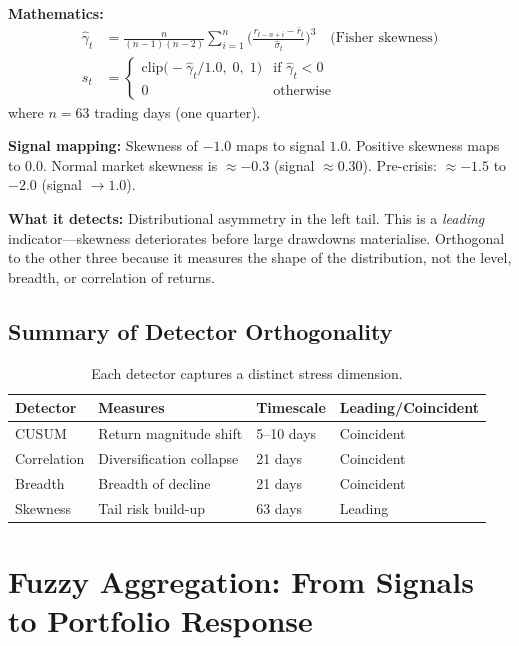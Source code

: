 \documentclass[11pt,a4paper]{article}
\begin{document}
\textbf{Mathematics:}
\begin{align}
  \hat{\gamma}_t &= \frac{n}{(n-1)(n-2)} \sum_{i=1}^{n} \bigg(\frac{r_{t-n+i} - \bar{r}_t}{\hat{\sigma}_t}\bigg)^3 \quad \text{(Fisher skewness)} \\
  s_t &= \begin{cases} \mathrm{clip}\big(-\hat{\gamma}_t / 1.0,\; 0,\; 1\big) & \text{if } \hat{\gamma}_t < 0 \\ 0 & \text{otherwise} \end{cases} \label{eq:skew-signal}
\end{align}
where $n = 63$ trading days (one quarter).

\textbf{Signal mapping:} Skewness of $-1.0$ maps to signal $1.0$. Positive skewness maps to $0.0$. Normal market skewness is $\approx -0.3$ (signal $\approx 0.30$). Pre-crisis: $\approx -1.5$ to $-2.0$ (signal $\to 1.0$).

\textbf{What it detects:} Distributional asymmetry in the left tail. This is a \emph{leading} indicator---skewness deteriorates before large drawdowns materialise. Orthogonal to the other three because it measures the shape of the distribution, not the level, breadth, or correlation of returns.

\subsection{Summary of Detector Orthogonality}

\begin{table}[h]
\centering
\begin{tabular}{llll}
\toprule
\textbf{Detector} & \textbf{Measures} & \textbf{Timescale} & \textbf{Leading/Coincident} \\
\midrule
CUSUM & Return magnitude shift & 5--10 days & Coincident \\
Correlation & Diversification collapse & 21 days & Coincident \\
Breadth & Breadth of decline & 21 days & Coincident \\
Skewness & Tail risk build-up & 63 days & Leading \\
\bottomrule
\end{tabular}
\caption{Each detector captures a distinct stress dimension.}
\label{tab:detectors}
\end{table}

\section{Fuzzy Aggregation: From Signals to Portfolio Response}
\label{sec:aggregation}
\end{document}

